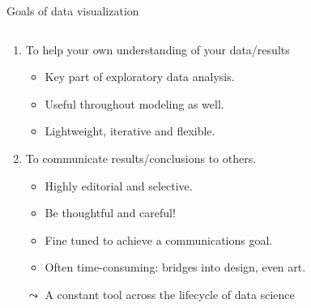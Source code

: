 \documentclass[aspectratio=169]{../latex_main/tntbeamer}  %
\begin{document}
	\begin{frame}[c]{Goals of data visualization}
	
	    \vspace{-1em}
	    \begin{columns}
	    \begin{column}{.6\textwidth}
	      \begin{enumerate}
	          \item To help your own understanding of your data/results
	          \begin{itemize}
	              \item Key part of exploratory data analysis.
	              \item Useful throughout modeling as well.
	              \item Lightweight, iterative and flexible.
	          \end{itemize}
	          \pause
	          \medskip
	          \item To communicate results/conclusions to others.
	          \begin{itemize}
	              \item Highly editorial and selective. 
	              \item Be thoughtful and careful!
	              \item Fine tuned to achieve a communications goal.
	              \item Often time-consuming: bridges into design, even art.
	          \end{itemize}
	          $\leadsto$ A constant tool across the lifecycle of data science
	     \end{enumerate}


\end{column}
\end{columns}
\end{frame}
\end{document}
